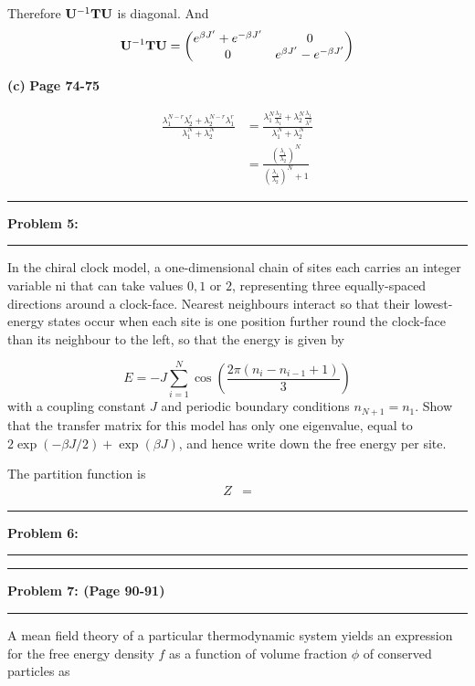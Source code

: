 \documentclass[11pt]{article}
\newcommand\question[2]{\vspace{.25in}\hrule\textbf{#1: #2}\vspace{.5em}\hrule\vspace{.10in}}
\renewcommand\part[1]{\vspace{.10in}\textbf{(#1)}}
\begin{document}
Therefore $\mathbf{U}^{-1}\mathbf{T}\mathbf{U}$ is diagonal. And
\begin{equation}
    \mathbf{U}^{-1}\mathbf{T}\mathbf{U} = \begin{pmatrix}
        e^{\beta J'} + e^{-\beta J'} & 0 \\
        0 & e^{\beta J'} - e^{-\beta J'}
    \end{pmatrix}
\end{equation}

\part{c} \textbf{Page 74-75}

\solution 

\begin{align*}
    \frac{\lambda_1^{N-r}\lambda_2^{r} + \lambda_2^{N-r}\lambda_1^{r}}{\lambda_1^N+\lambda_2^N} &= \frac{\lambda_1^{N}\frac{\lambda_2}{\lambda_1}+\lambda_2^N\frac{\lambda_1}{\lambda^2}}{\lambda_1^N+\lambda_2^N} \\
    &= \frac{\left(\frac{\lambda_1}{\lambda_2}\right)^N}{\left(\frac{\lambda_1}{\lambda_2}\right)^N+1}
\end{align*}

\question{Problem 5}{}
In the chiral clock model, a one-dimensional chain of sites each carries an integer variable ni that can take values $0, 1$ or $2$, representing three equally-spaced directions around a clock-face. 
Nearest neighbours interact so that their lowest-energy states occur when each site is one position further round the clock-face than its neighbour to the left, so that the energy is given by

\begin{equation}
    E = -J\sum_{i=1}^{N} \cos\left(\frac{2\pi(n_i-n_{i-1} + 1)}{3}\right)
\end{equation}
with a coupling constant $J$ and periodic boundary conditions $n_{N+1} = n_1$.
Show that the transfer matrix for this model has only one eigenvalue, equal to
$2\exp(-\beta J/2)+\exp(\beta J)$, and hence write down the free energy per site.

\solution 

The partition function is 
\begin{align*}
    Z &= 
\end{align*}

\question{Problem 6}{}

\question{Problem 7}{(\textbf{Page 90-91})}
A mean field theory of a particular thermodynamic system yields an expression for the
free energy density $f$ as a function of volume fraction $\phi$ of conserved particles as
\end{document}
